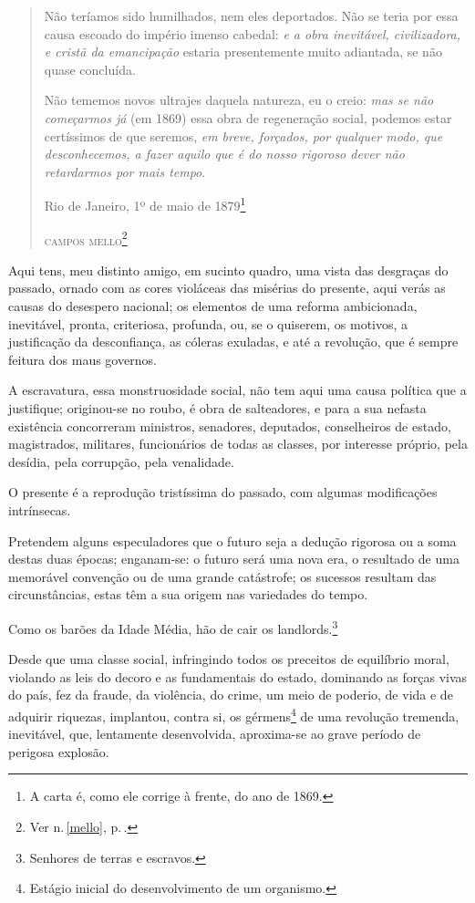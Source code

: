 {\begin{quote}
Não teríamos sido humilhados, nem eles deportados. Não se teria por essa
causa escoado do império imenso cabedal: \emph{e a obra inevitável,
civilizadora, e cristã da emancipação} estaria presentemente muito
adiantada, se não quase concluída.

Não tememos novos ultrajes daquela natureza, eu o creio: \emph{mas se
não começarmos já} (em 1869) essa obra de regeneração social, podemos
estar certíssimos de que seremos, \emph{em breve, forçados, por qualquer
modo, que desconhecemos, a fazer aquilo que é do nosso rigoroso dever
não retardarmos por mais tempo}.\medskip

\hfill{}Rio de Janeiro, 1º de maio de 1879\footnote{A carta é, como ele corrige à
  frente, do ano de 1869.}

\hfill\textsc{campos mello}\footnote{Ver n.\,\ref{mello}, p.\,\pageref{mello}.}
\end{quote}  

Aqui tens, meu distinto amigo, em sucinto quadro, uma vista das
desgraças do passado, ornado com as cores violáceas das misérias do
presente, aqui verás as causas do desespero nacional; os elementos de
uma reforma ambicionada, inevitável, pronta, criteriosa, profunda, ou,
se o quiserem, os motivos, a justificação da desconfiança, as cóleras
exuladas, e até a revolução, que é sempre feitura dos maus governos.

A escravatura, essa monstruosidade social, não tem aqui uma causa
política que a justifique; originou-se no roubo, é obra de salteadores,
e para a sua nefasta existência concorreram ministros, senadores,
deputados, conselheiros de estado, magistrados, militares, funcionários
de todas as classes, por interesse próprio, pela desídia, pela
corrupção, pela venalidade.

O presente é a reprodução tristíssima do passado, com algumas
modificações intrínsecas.

Pretendem alguns especuladores que o futuro seja a dedução rigorosa ou a
soma destas duas épocas; enganam-se: o futuro será uma nova era, o
resultado de uma memorável convenção ou de uma grande catástrofe; os
sucessos resultam das circunstâncias, estas têm a sua origem nas
variedades do tempo.

Como os barões da Idade Média, hão de cair os landlords.\footnote{
  Senhores de terras e escravos.}

Desde que uma classe social, infringindo todos os preceitos de
equilíbrio moral, violando as leis do decoro e as fundamentais do
estado, dominando as forças vivas do país, fez da fraude, da violência,
do crime, um meio de poderio, de vida e de adquirir riquezas, implantou,
contra si, os gérmens\footnote{Estágio inicial do desenvolvimento de
  um organismo.} de uma
revolução tremenda, inevitável, que, lentamente desenvolvida,
aproxima-se ao grave período de perigosa explosão.

}
